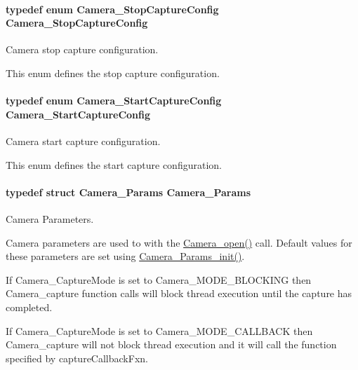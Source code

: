 \paragraph[{Camera\+\_\+\+Stop\+Capture\+Config}]{\setlength{\rightskip}{0pt plus 5cm}typedef enum {\bf Camera\+\_\+\+Stop\+Capture\+Config}  {\bf Camera\+\_\+\+Stop\+Capture\+Config}}\label{_camera_8h_a8b5e3682ad3dca8fd314d7a09e374a68}


Camera stop capture configuration. 

This enum defines the stop capture configuration. 
\paragraph[{Camera\+\_\+\+Start\+Capture\+Config}]{\setlength{\rightskip}{0pt plus 5cm}typedef enum {\bf Camera\+\_\+\+Start\+Capture\+Config}  {\bf Camera\+\_\+\+Start\+Capture\+Config}}\label{_camera_8h_a997e6ea5651105da0ee6f8f473e246dd}


Camera start capture configuration. 

This enum defines the start capture configuration. 
\paragraph[{Camera\+\_\+\+Params}]{\setlength{\rightskip}{0pt plus 5cm}typedef struct {\bf Camera\+\_\+\+Params}  {\bf Camera\+\_\+\+Params}}\label{_camera_8h_af493a9fc2ad7b908176dafd7dc39d167}


Camera Parameters. 

Camera parameters are used to with the \hyperlink{_camera_8h_a5bd1f515c97e0f598ff554c663bc6cde}{Camera\+\_\+open()} call. Default values for these parameters are set using \hyperlink{_camera_8h_a522620ae3e5fb202b1f46f5535619564}{Camera\+\_\+\+Params\+\_\+init()}.

If Camera\+\_\+\+Capture\+Mode is set to Camera\+\_\+\+M\+O\+D\+E\+\_\+\+B\+L\+O\+C\+K\+I\+N\+G then Camera\+\_\+capture function calls will block thread execution until the capture has completed.

If Camera\+\_\+\+Capture\+Mode is set to Camera\+\_\+\+M\+O\+D\+E\+\_\+\+C\+A\+L\+L\+B\+A\+C\+K then Camera\+\_\+capture will not block thread execution and it will call the function specified by capture\+Callback\+Fxn.


